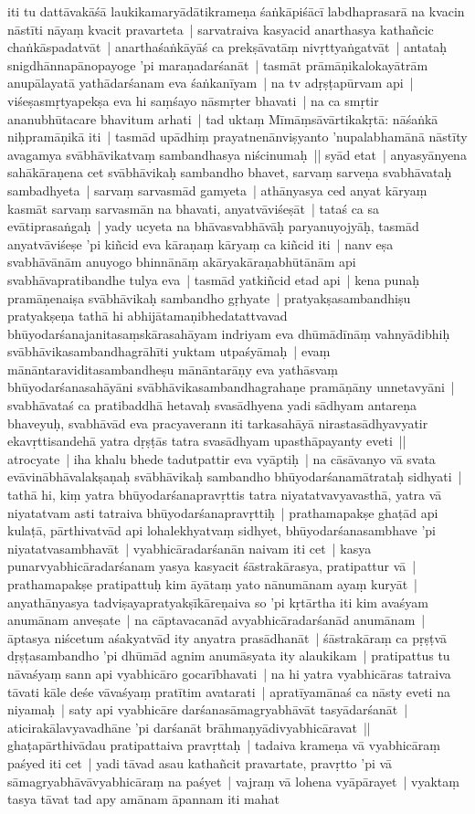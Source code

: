 \documentclass[article,12pt,a4paper]{memoir}
\begin{document}
	  \pstart iti tu dattāvakāśā laukikamaryādātikrameṇa śaṅkāpiśācī labdhaprasarā na kvacin nāstīti nāyaṃ kvacit pravarteta | sarvatraiva kasyacid anarthasya kathañcic chaṅkāspadatvāt | anarthaśaṅkāyāś ca prekṣāvatāṃ nivṛttyaṅgatvāt | antataḥ snigdhānnapānopayoge 'pi maraṇadarśanāt | tasmāt prāmāṇikalokayātrām anupālayatā yathādarśanam eva śaṅkanīyam | na tv adṛṣṭapūrvam api | viśeṣasmṛtyapekṣa eva hi saṃśayo nāsmṛter bhavati | na ca smṛtir ananubhūtacare bhavitum arhati | tad uktaṃ Mīmāṃsāvārtikakṛtā: nāśaṅkā niḥpramāṇikā iti | tasmād upādhiṃ prayatnenānviṣyanto 'nupalabhamānā nāstīty avagamya svābhāvikatvaṃ sambandhasya niścinumaḥ || \label{thakur75-107.16} syād etat | anyasyānyena sahākāraṇena cet svābhāvikaḥ sambandho bhavet, sarvaṃ sarveṇa svabhāvataḥ sambadhyeta | sarvaṃ sarvasmād gamyeta | athānyasya ced anyat kāryaṃ kasmāt sarvaṃ sarvasmān na bhavati, anyatvāviśeṣāt | tataś ca sa evātiprasaṅgaḥ | yady ucyeta na bhāvasvabhāvāḥ paryanuyojyāḥ, tasmād anyatvāviśeṣe 'pi kiñcid eva kāraṇaṃ kāryaṃ ca kiñcid iti | nanv eṣa svabhāvānām anuyogo bhinnānāṃ akāryakāraṇabhūtānām api svabhāvapratibandhe tulya eva | tasmād yatkiñcid etad api | kena punaḥ pramāṇenaiṣa svābhāvikaḥ sambandho gṛhyate | pratyakṣasambandhiṣu pratyakṣeṇa tathā hi abhijātamaṇibhedatattvavad bhūyodarśanajanitasaṃskārasahāyam indriyam eva dhūmādīnāṃ vahnyādibhiḥ svābhāvikasambandhagrāhīti yuktam utpaśyāmaḥ | evaṃ mānāntaraviditasambandheṣu mānāntarāṇy eva yathāsvaṃ bhūyodarśanasahāyāni svābhāvikasambandhagrahaṇe pramāṇāny unnetavyāni | svabhāvataś ca pratibaddhā hetavaḥ svasādhyena yadi sādhyam antareṇa bhaveyuḥ, svabhāvād eva pracyaverann iti tarkasahāyā nirastasādhyavyatir ekavṛttisandehā yatra dṛṣṭās tatra svasādhyam upasthāpayanty eveti || \label{thakur75-108.3} atrocyate | iha khalu bhede tadutpattir eva vyāptiḥ | na cāsāvanyo vā svata evāvinābhāvalakṣaṇaḥ svābhāvikaḥ sambandho bhūyodarśanamātrataḥ sidhyati | tathā hi, kiṃ yatra bhūyodarśanapravṛttis tatra niyatatvavyavasthā, yatra vā niyatatvam asti tatraiva bhūyodarśanapravṛttiḥ | prathamapakṣe ghaṭād api kulaṭā, pārthivatvād api lohalekhyatvaṃ sidhyet, bhūyodarśanasambhave 'pi niyatatvasambhavāt | \label{thakur75-108.8} vyabhicāradarśanān naivam iti cet | kasya punarvyabhicāradarśanam yasya kasyacit śāstrakārasya, pratipattur vā | prathamapakṣe pratipattuḥ kim āyātaṃ yato nānumānam ayaṃ kuryāt | anyathānyasya tadviṣayapratyakṣīkāreṇaiva so 'pi kṛtārtha iti kim avaśyam anumānam anveṣate | na cāptavacanād avyabhicāradarśanād anumānam | āptasya niścetum aśakyatvād ity anyatra prasādhanāt | śāstrakāraṃ ca pṛṣṭvā dṛṣṭasambandho 'pi dhūmād agnim anumāsyata ity alaukikam | pratipattus tu nāvaśyaṃ sann api vyabhicāro gocarībhavati | na hi yatra vyabhicāras tatraiva tāvati kāle deśe vāvaśyaṃ pratītim avatarati | apratīyamānaś ca nāsty eveti na niyamaḥ | saty api vyabhicāre darśanasāmagryabhāvāt tasyādarśanāt | aticirakālavyavadhāne 'pi darśanāt brāhmaṇyādivyabhicāravat || \label{thakur75-108.18} ghaṭapārthivādau pratipattaiva pravṛttaḥ | tadaiva krameṇa vā vyabhicāraṃ paśyed iti cet | yadi tāvad asau kathañcit pravartate, pravṛtto 'pi vā sāmagryabhāvāvyabhicāraṃ na paśyet | vajraṃ vā lohena vyāpārayet | vyaktaṃ tasya tāvat tad apy amānam āpannam iti mahat 
\end{document}
